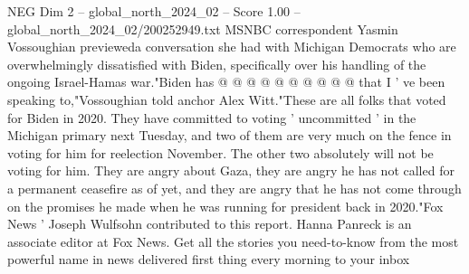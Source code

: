 \begin{textsample}{NEG Dim 2 – global\_north\_2024\_02 – Score 1.00 – global\_north\_2024\_02/200252949.txt}
MSNBC correspondent Yasmin Vossoughian previeweda conversation she had with Michigan Democrats who are overwhelmingly dissatisfied with Biden, specifically over his handling of the ongoing Israel-Hamas war."Biden has @ @ @ @ @ @ @ @ @ @ that I ' ve been speaking to,"Vossoughian told anchor Alex Witt."These are all folks that voted for Biden in 2020.
They have committed to voting ' uncommitted ' in the Michigan primary next Tuesday, and two of them are very much on the fence in voting for him for reelection November.
The other two absolutely will not be voting for him.
They are angry about Gaza, they are angry he has not called for a permanent ceasefire as of yet, and they are angry that he has not come through on the promises he made when he was running for president back in 2020."Fox News ' Joseph Wulfsohn contributed to this report.
Hanna Panreck is an associate editor at Fox News.
Get all the stories you need-to-know from the most powerful name in news delivered first thing every morning to your inbox

\end{textsample}
